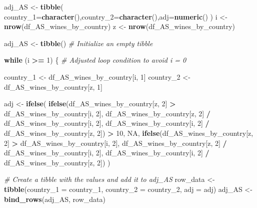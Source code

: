 \documentclass[
]{article}
\newenvironment{Shaded}{\begin{snugshade}}{\end{snugshade}}
\newcommand{\AttributeTok}[1]{\textcolor[rgb]{0.13,0.29,0.53}{#1}}
\newcommand{\CommentTok}[1]{\textcolor[rgb]{0.56,0.35,0.01}{\textit{#1}}}
\newcommand{\ConstantTok}[1]{\textcolor[rgb]{0.56,0.35,0.01}{#1}}
\newcommand{\ControlFlowTok}[1]{\textcolor[rgb]{0.13,0.29,0.53}{\textbf{#1}}}
\newcommand{\DecValTok}[1]{\textcolor[rgb]{0.00,0.00,0.81}{#1}}
\newcommand{\FunctionTok}[1]{\textcolor[rgb]{0.13,0.29,0.53}{\textbf{#1}}}
\newcommand{\NormalTok}[1]{#1}
\newcommand{\OtherTok}[1]{\textcolor[rgb]{0.56,0.35,0.01}{#1}}
\newcommand{\SpecialCharTok}[1]{\textcolor[rgb]{0.81,0.36,0.00}{\textbf{#1}}}
\begin{document}
\begin{Shaded}
\begin{Highlighting}[]
\NormalTok{adj\_AS }\OtherTok{\textless{}{-}} \FunctionTok{tibble}\NormalTok{( }\AttributeTok{country\_1=}\FunctionTok{character}\NormalTok{(),}\AttributeTok{country\_2=}\FunctionTok{character}\NormalTok{(),}\AttributeTok{adj=}\FunctionTok{numeric}\NormalTok{()}
\NormalTok{)}
\NormalTok{i }\OtherTok{\textless{}{-}} \FunctionTok{nrow}\NormalTok{(df\_AS\_wines\_by\_country)}
\NormalTok{z }\OtherTok{\textless{}{-}} \FunctionTok{nrow}\NormalTok{(df\_AS\_wines\_by\_country)}

\NormalTok{adj\_AS }\OtherTok{\textless{}{-}} \FunctionTok{tibble}\NormalTok{()  }\CommentTok{\# Initialize an empty tibble}

\ControlFlowTok{while}\NormalTok{ (i }\SpecialCharTok{\textgreater{}=} \DecValTok{1}\NormalTok{) \{  }\CommentTok{\# Adjusted loop condition to avoid i = 0}

\NormalTok{  country\_1 }\OtherTok{\textless{}{-}}\NormalTok{ df\_AS\_wines\_by\_country[i, }\DecValTok{1}\NormalTok{]}
\NormalTok{  country\_2 }\OtherTok{\textless{}{-}}\NormalTok{ df\_AS\_wines\_by\_country[z, }\DecValTok{1}\NormalTok{]}

\NormalTok{  adj }\OtherTok{\textless{}{-}} \FunctionTok{ifelse}\NormalTok{(}
    \FunctionTok{ifelse}\NormalTok{(df\_AS\_wines\_by\_country[z, }\DecValTok{2}\NormalTok{] }\SpecialCharTok{\textgreater{}}\NormalTok{ df\_AS\_wines\_by\_country[i, }\DecValTok{2}\NormalTok{],}
\NormalTok{           df\_AS\_wines\_by\_country[z, }\DecValTok{2}\NormalTok{] }\SpecialCharTok{/}\NormalTok{ df\_AS\_wines\_by\_country[i, }\DecValTok{2}\NormalTok{],}
\NormalTok{           df\_AS\_wines\_by\_country[i, }\DecValTok{2}\NormalTok{] }\SpecialCharTok{/}\NormalTok{ df\_AS\_wines\_by\_country[z, }\DecValTok{2}\NormalTok{]) }\SpecialCharTok{\textgreater{}} \DecValTok{10}\NormalTok{,}
    \ConstantTok{NA}\NormalTok{,}
    \FunctionTok{ifelse}\NormalTok{(df\_AS\_wines\_by\_country[z, }\DecValTok{2}\NormalTok{] }\SpecialCharTok{\textgreater{}}\NormalTok{ df\_AS\_wines\_by\_country[i, }\DecValTok{2}\NormalTok{],}
\NormalTok{           df\_AS\_wines\_by\_country[z, }\DecValTok{2}\NormalTok{] }\SpecialCharTok{/}\NormalTok{ df\_AS\_wines\_by\_country[i, }\DecValTok{2}\NormalTok{],}
\NormalTok{           df\_AS\_wines\_by\_country[i, }\DecValTok{2}\NormalTok{] }\SpecialCharTok{/}\NormalTok{ df\_AS\_wines\_by\_country[z, }\DecValTok{2}\NormalTok{])}
\NormalTok{  )}

  \CommentTok{\# Create a tibble with the values and add it to adj\_AS}
\NormalTok{  row\_data }\OtherTok{\textless{}{-}} \FunctionTok{tibble}\NormalTok{(}\AttributeTok{country\_1 =}\NormalTok{ country\_1, }\AttributeTok{country\_2 =}\NormalTok{ country\_2, }\AttributeTok{adj =}\NormalTok{ adj)}
\NormalTok{  adj\_AS }\OtherTok{\textless{}{-}} \FunctionTok{bind\_rows}\NormalTok{(adj\_AS, row\_data)}


\end{Highlighting}
\end{Shaded}
\end{document}
